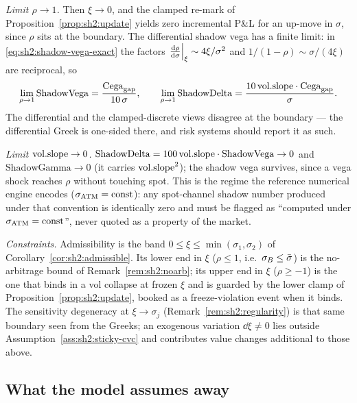 \emph{Limit $\rho \to 1$.} Then $\xi \to 0$, and the clamped re-mark of
Proposition~\ref{prop:sh2:update} yields zero incremental P\&L for an
up-move in $\sigma$, since $\rho$ sits at the boundary. The differential
shadow vega has a finite limit: in \eqref{eq:sh2:shadow-vega-exact} the
factors $\left.\frac{\mathrm{d} \rho}{\mathrm{d} \sigma}\right|_{\xi} \sim 4\xi/\sigma^2$ and
$1/(1 - \rho) \sim \sigma/(4\xi)$ are reciprocal, so
\[
  \lim_{\rho \to 1} \mathrm{ShadowVega} = \frac{\mathrm{Cega}_{\mathrm{gap}}}{10\,\sigma},
  \qquad
  \lim_{\rho \to 1} \mathrm{ShadowDelta} = \frac{10\,\mathrm{vol.slope}\cdot\mathrm{Cega}_{\mathrm{gap}}}{\sigma}.
\]
The differential and the clamped-discrete views disagree at the boundary
--- the differential Greek is one-sided there, and risk systems should
report it as such.

\emph{Limit $\mathrm{vol.slope} \to 0$.}
$\mathrm{ShadowDelta} = 100\,\mathrm{vol.slope}\cdot\mathrm{ShadowVega} \to 0$ and
$\mathrm{ShadowGamma} \to 0$ (it carries $\mathrm{vol.slope}^2$); the shadow vega
survives, since a vega shock reaches $\rho$ without touching spot. This is
the regime the reference numerical engine encodes
($\sigma_{\mathrm{ATM}} = \text{const}$): any spot-channel shadow number produced under
that convention is identically zero and must be flagged as ``computed
under $\sigma_{\mathrm{ATM}} = \text{const}$'', never quoted as a property of the market.

\emph{Constraints.} Admissibility is the band
$0 \le \xi \le \min(\sigma_1, \sigma_2)$ of
Corollary~\ref{cor:sh2:admissible}. Its lower end in $\xi$ ($\rho \le 1$,
i.e.\ $\sigma_B \le \bar\sigma$) is the no-arbitrage bound of
Remark~\ref{rem:sh2:noarb}; its upper end in $\xi$ ($\rho \ge -1$) is the
one that binds in a vol collapse at frozen $\xi$ and is guarded by the
lower clamp of Proposition~\ref{prop:sh2:update}, booked as a
freeze-violation event when it binds. The sensitivity degeneracy at
$\xi \to \sigma_j$ (Remark~\ref{rem:sh2:regularity}) is that same
boundary seen from the Greeks; an exogenous
variation $\dd\xi \neq 0$ lies outside
Assumption~\ref{ass:sh2:sticky-cvc} and contributes value changes
additional to those above.

\subsection{What the model assumes away}\label{sec:sh2:frictions}

